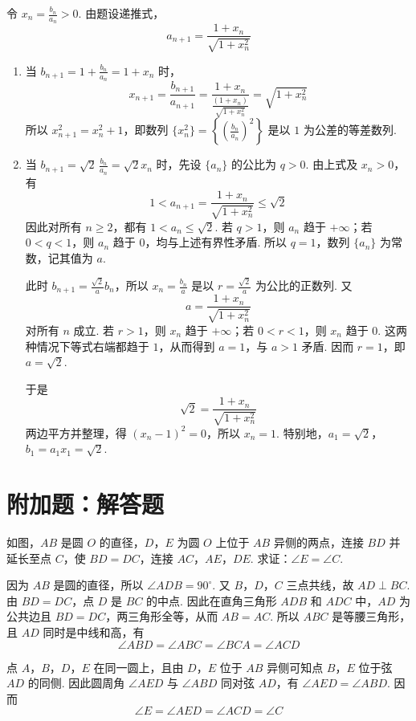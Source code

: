 \begin{solution}
令 \(x_n=\frac{b_n}{a_n}>0\). 由题设递推式，
\[
a_{n+1}=\frac{1+x_n}{\sqrt{1+x_n^2}}
\]

\begin{enumerate}
\item 当 \(b_{n+1}=1+\frac{b_n}{a_n}=1+x_n\) 时，
\[
x_{n+1}=\frac{b_{n+1}}{a_{n+1}}=\frac{1+x_n}{\frac{(1+x_n)}{\sqrt{1+x_n^2}}}=\sqrt{1+x_n^2}
\]
所以 \(x_{n+1}^2=x_n^2+1\)，即数列 \(\{x_n^2\}=\left\{\left(\frac{b_n}{a_n}\right)^2\right\}\) 是以 \(1\) 为公差的等差数列.

\item 当 \(b_{n+1}=\sqrt{2}\,\frac{b_n}{a_n}=\sqrt{2}x_n\) 时，先设 \(\{a_n\}\) 的公比为 \(q>0\). 由上式及 \(x_n>0\)，有
\[
1<a_{n+1}=\frac{1+x_n}{\sqrt{1+x_n^2}}\leqslant\sqrt{2}
\]
因此对所有 \(n\geqslant2\)，都有 \(1<a_n\leqslant\sqrt{2}\). 若 \(q>1\)，则 \(a_n\) 趋于 \(+\infty\)；若 \(0<q<1\)，则 \(a_n\) 趋于 \(0\)，均与上述有界性矛盾. 所以 \(q=1\)，数列 \(\{a_n\}\) 为常数，记其值为 \(a\).

此时 \(b_{n+1}=\frac{\sqrt{2}}{a}b_n\)，所以 \(x_n=\frac{b_n}{a}\) 是以 \(r=\frac{\sqrt{2}}{a}\) 为公比的正数列. 又
\[
a=\frac{1+x_n}{\sqrt{1+x_n^2}}
\]
对所有 \(n\) 成立. 若 \(r>1\)，则 \(x_n\) 趋于 \(+\infty\)；若 \(0<r<1\)，则 \(x_n\) 趋于 \(0\). 这两种情况下等式右端都趋于 \(1\)，从而得到 \(a=1\)，与 \(a>1\) 矛盾. 因而 \(r=1\)，即 \(a=\sqrt{2}\).

于是
\[
\sqrt{2}=\frac{1+x_n}{\sqrt{1+x_n^2}}
\]
两边平方并整理，得 \((x_n-1)^2=0\)，所以 \(x_n=1\). 特别地，\(a_1=\sqrt{2}\)，\(b_1=a_1x_1=\sqrt{2}\).
\end{enumerate}
\end{solution}

\section{附加题：解答题}

\begin{problem}[A]
如图，\(AB\) 是圆 \(O\) 的直径，\(D\)，\(E\) 为圆 \(O\) 上位于 \(AB\) 异侧的两点，连接 \(BD\) 并延长至点 \(C\)，使 \(BD=DC\)，连接 \(AC\)，\(AE\)，\(DE\). 求证：\(\angle E=\angle C\).

\end{problem}

\begin{solution}
因为 \(AB\) 是圆的直径，所以 \(\angle ADB=90^\circ\). 又 \(B\)，\(D\)，\(C\) 三点共线，故 \(AD\perp BC\). 由 \(BD=DC\)，点 \(D\) 是 \(BC\) 的中点. 因此在直角三角形 \(ADB\) 和 \(ADC\) 中，\(AD\) 为公共边且 \(BD=DC\)，两三角形全等，从而 \(AB=AC\). 所以 \(ABC\) 是等腰三角形，且 \(AD\) 同时是中线和高，有
\[
\angle ABD=\angle ABC=\angle BCA=\angle ACD
\]

点 \(A\)，\(B\)，\(D\)，\(E\) 在同一圆上，且由 \(D\)，\(E\) 位于 \(AB\) 异侧可知点 \(B\)，\(E\) 位于弦 \(AD\) 的同侧. 因此圆周角 \(\angle AED\) 与 \(\angle ABD\) 同对弦 \(AD\)，有 \(\angle AED=\angle ABD\). 因而
\[
\angle E=\angle AED=\angle ACD=\angle C
\]
\end{solution}

